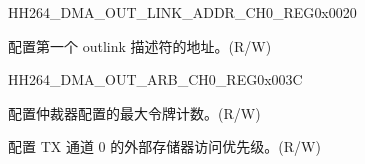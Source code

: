     \begin{register}{H}{H264\_DMA\_OUT\_LINK\_ADDR\_CH0\_REG}{0x0020}\label{regdesc:H264DMAOUTLINKADDRCH0REG}
    \regnewline%
    \begin{regdesc}\begin{reglist}
    \label{fielddesc:H264DMAOUTLINKADDRCH0}\item [H264\_DMA\_OUTLINK\_ADDR\_CH0] 配置第一个 outlink 描述符的地址。(R/W)
    \end{reglist}\end{regdesc}
    \end{register}
    
    \begin{register}{H}{H264\_DMA\_OUT\_ARB\_CH0\_REG}{0x003C}\label{regdesc:H264DMAOUTARBCH0REG}
    \regnewline%
    \begin{regdesc}\begin{reglist}
    \label{fielddesc:H264DMAOUTARBTOKENNUMCH0}\item [H264\_DMA\_OUT\_ARB\_TOKEN\_NUM\_CH0] 配置仲裁器配置的最大令牌计数。(R/W)
    \label{fielddesc:H264DMAEXTEROUTARBPRIORITYCH0}\item [H264\_DMA\_EXTER\_OUT\_ARB\_PRIORITY\_CH0] 配置 TX 通道 0 的外部存储器访问优先级。(R/W)
    \end{reglist}\end{regdesc}
    \end{register}
    
